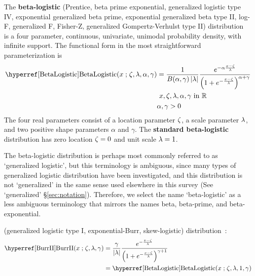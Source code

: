 


\label{sec:BetaLogistic} 
{} 
{}  



The {\bf beta-logistic } (Prentice, beta prime exponential, generalized logistic type IV, exponential generalized beta prime, exponential generalized beta type II, log-F, generalized F, Fisher-Z, generalized Gompertz-Verhulst type II) distribution~\cite{Prentice1976, McDonald1991, Johnson1995, Morton2000}
 is a four parameter, continuous, univariate, unimodal probability density, with infinite  support. The functional form in the most straightforward parameterization is
\begin{align}
\notag
\label{BetaLogistic}
\opr{BetaLogistic}(x\given  \pLoc, \pScale,\alpha,\gamma) 
& =
 \frac{1}{B(\alpha, \gamma) \left| \pScale\right|}
 \frac{e^{-\alpha \frac{x-\pLoc}{\pScale} }} { \left(1 + e^{-\frac{x-\pLoc}{\pScale}  }\right)^{\alpha+\gamma} } \checked
\\  &
\ x, \pLoc, \pScale,\alpha,\gamma \text{ in } {\mathbb R}
\\ \notag & \alpha,\gamma >0
\end{align}
The four real parameters consist of a location parameter $\zeta$, a scale parameter $\lambda$, and two positive shape parameters $\alpha$ and $\gamma$.  The {\bf standard beta-logistic} distribution has zero location $\zeta=0$ and unit scale $\lambda=1$.

The beta-logistic distribution is perhaps most commonly referred to as `generalized logistic', but this terminology is ambiguous, since many types of generalized logistic distribution have been investigated, and this distribution is not `generalized' in the same sense used elsewhere in this survey (See `generalized' \S \ref{sec:notation}). Therefore, we select the name `beta-logistic' as a less ambiguous terminology that mirrors the names beta, beta-prime, and beta-exponential.





 (generalized logistic type I, exponential-Burr, skew-logistic) distribution~\cite{Burr1942,Johnson1994}:
\begin{align}
\label{BurrII}
\opr{BurrII}(x\given \pLoc, \pScale,  \gamma) 
& = \frac{\gamma}{|\pScale|} \frac{e^{- \frac{x-\pLoc}{\pScale} } } { \left(1 + e^{-\frac{x-\pLoc}{\pScale}  }\right)^{\gamma+1} }
\checked
\\
& = \opr{BetaLogistic}(x\given \pLoc, \pScale, 1, \gamma) \checked
\notag
\end{align}


